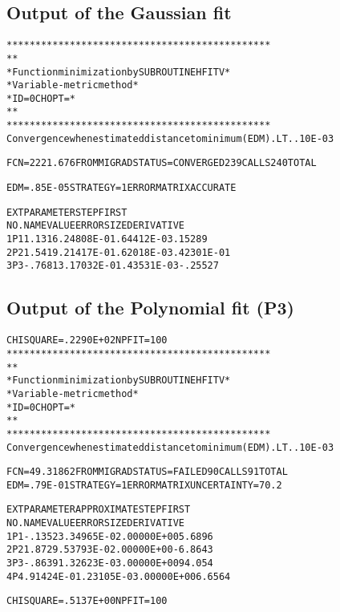 \subsection*{Output of the Gaussian fit}
\begin{alltt}
     **********************************************
     *                                            *
     * Function minimization by SUBROUTINE HFITV  *
     * Variable-metric method                     *
     * ID =          0  CHOPT =                   *
     *                                            *
     **********************************************
 Convergence when estimated distance to minimum (EDM) .LT.   .10E-03

 FCN=   2221.676     FROM MIGRAD    STATUS=CONVERGED    239 CALLS      240 TOTAL

                     EDM=   .85E-05    STRATEGY= 1      ERROR MATRIX ACCURATE

  EXT PARAMETER                                   STEP         FIRST
  NO.   NAME        VALUE          ERROR          SIZE      DERIVATIVE
   1      P1        1.1316        .24808E-01    .64412E-03    .15289
   2      P2        1.5419        .21417E-01    .62018E-03    .42301E-01
   3      P3       -.76813        .17032E-01    .43531E-03   -.25527
\end{alltt}
\subsection*{Output of the Polynomial fit (P3)}
\begin{alltt}
 CHISQUARE =  .2290E+02  NPFIT =  100
     **********************************************
     *                                            *
     * Function minimization by SUBROUTINE HFITV  *
     * Variable-metric method                     *
     * ID =          0  CHOPT =                   *
     *                                            *
     **********************************************
 Convergence when estimated distance to minimum (EDM) .LT.   .10E-03

 FCN=   49.31862     FROM MIGRAD    STATUS=FAILED        90 CALLS       91 TOTAL
                     EDM=   .79E-01  STRATEGY=1  ERROR MATRIX UNCERTAINTY= 70.2%

  EXT PARAMETER                APPROXIMATE        STEP         FIRST
  NO.   NAME        VALUE          ERROR          SIZE      DERIVATIVE
   1      P1       -.13523        .34965E-02    .00000E+00    5.6896
   2      P2        1.8729        .53793E-02    .00000E+00   -6.8643
   3      P3       -.86391        .32623E-03    .00000E+00    94.054
   4      P4        .91424E-01    .23105E-03    .00000E+00    6.6564

 CHISQUARE =  .5137E+00  NPFIT =  100
\end{alltt}
\clearpage
